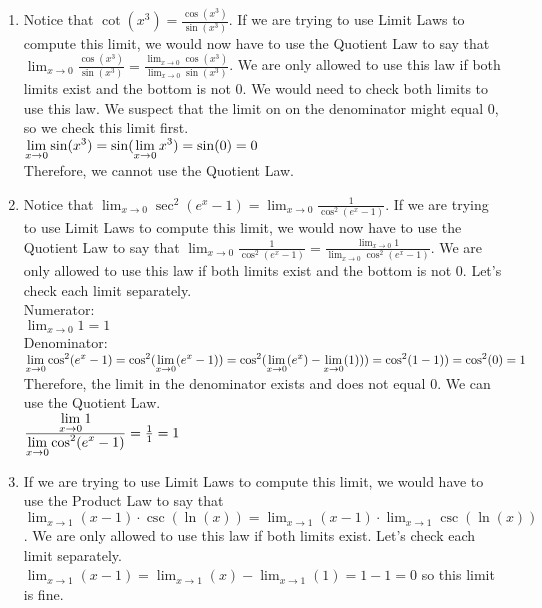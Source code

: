 \documentclass{ximera}
\begin{document}
\begin{question}
\begin{feedback}
\begin{enumerate}
    \item Notice that $\cot(x^3) = \frac{\cos(x^3)}{\sin(x^3)}$.  If we are trying to use Limit Laws to compute this limit, we would now have to use the Quotient Law to say that $\lim_{x\to 0} \frac{\cos(x^3)}{\sin(x^3)}
    = \frac{\lim_{x\to 0} \cos(x^3)}{\lim_{x\to 0} \sin(x^3)}$.  We are only allowed to use this law if both limits exist and the bottom is not 0. We would need to check both limits to use this law.  We suspect that the limit on on the denominator might equal 0, so we check this limit first.\\
    $\lim_{x\to 0} \sin(x^3)\\
    = \sin(\lim_{x\to 0}x^3)\\
    =\sin(0)=0$ \\
    Therefore, we cannot use the Quotient Law.
      
    \item  Notice that $\lim_{x\to 0} \sec^2(e^x-1) = \lim_{x\to 0} \frac{1}{\cos^2(e^x-1)}$.  If we are trying to use Limit Laws to compute this limit, we would now have to use the Quotient Law to say that $\lim_{x\to 0} \frac{1}{\cos^2(e^x-1)} = \frac{ \lim_{x\to 0}1}{ \lim_{x\to 0}\cos^2(e^x-1)}$.  We are only allowed to use this law if both limits exist and the bottom is not 0.  Let's check each limit separately.\\
   Numerator:\\
   $\lim_{x\to 0}1=1$\\
   Denominator:\\
   $\lim_{x\to 0}\cos^2(e^x-1)\\
   = \cos^2(\lim_{x\to 0}(e^x-1))\\
   = \cos^2(\lim_{x\to 0}(e^x)-\lim_{x\to 0}(1)))\\
   = \cos^2(1-1))\\
   = \cos^2(0)=1$\\
   Therefore, the limit in the denominator exists and does not equal 0.  We can use the Quotient Law.\\
   $\frac{ \lim_{x\to 0}1}{ \lim_{x\to 0}\cos^2(e^x-1)} = \frac{1}{1}=1\\ $
   
   \item If we are trying to use Limit Laws to compute this limit, we would have to use the Product Law to say that $\lim_{x\to 1}{(x-1)\cdot \csc(\ln(x))}= \lim_{x\to 1}{(x-1)\cdot \lim_{x\to 1}\csc(\ln(x))}$.  We are only allowed to use this law if both limits exist.
   Let's check each limit separately.  \\
   $\lim_{x\to 1} (x-1) = \lim_{x\to 1} (x)-\lim_{x\to 1}(1)=1-1=0$ so this limit is fine.\\
   

\end{enumerate}
\end{feedback}
\end{question}
\end{document}
